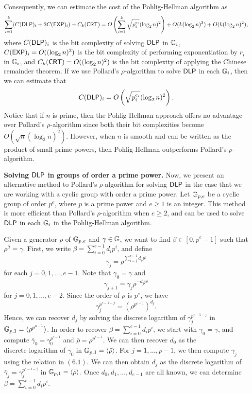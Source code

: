 \newpage 
Consequently, we can estimate the cost of the Pohlig-Hellman algorithm as 
\[ \sum_{i=1}^k (C({\sf DLP})_i + 2C({\sf EXP})_i) + C_k({\sf CRT}) = 
O \left( \sum_{i=1}^k \sqrt{p_i^{e_i}} (\log_2 n)^2 \right) + 
O(k(\log_2 n)^3) + O(k(\log_2 n)^2), \] 
where $C({\sf DLP})_i$ is the bit complexity of solving ${\sf DLP}$ in $\mathbb{G}_i$, 
$C({\sf EXP})_i = O((\log_2 n)^3)$ is the bit complexity of performing exponentiation 
by $r_i$ in $\mathbb{G}_i$, and $C_k({\sf CRT}) = O((\log_2 n)^2)$ is the bit complexity of 
applying the Chinese remainder theorem. If we use Pollard's $\rho$-algorithm 
to solve ${\sf DLP}$ in each $\mathbb{G}_i$, then we can estimate that 
\[ C({\sf DLP})_i = O\left( \sqrt{p_i^{e_i}} (\log_2 n)^2 \right). \] 
Notice that if $n$ is prime, then the Pohlig-Hellman approach offers no advantage 
over Pollard's $\rho$-algorithm since both their bit complexities become 
$O(\sqrt n (\log_2 n)^2)$. However, when $n$ is smooth and can be written as 
the product of small prime powers, then Pohlig-Hellman outperforms Pollard's 
$\rho$-algorithm.

{\bf Solving ${\sf DLP}$ in groups of order a prime power.} Now, we present 
an alternative method to Pollard's $\rho$-algorithm for solving ${\sf DLP}$ in the 
case that we are working with a cyclic group with order a prime power. 
Let $\mathbb{G}_{p,e}$ be a cyclic group of order $p^e$, where $p$ is a prime power and 
$e \geq 1$ is an integer. This method is more efficient than Pollard's 
$\rho$-algorithm when $e \geq 2$, and can be used to solve ${\sf DLP}$ in each $\mathbb{G}_i$ 
in the Pohlig-Hellman algorithm. 

Given a generator $\rho$ of $\mathbb{G}_{p,e}$ and $\gamma \in \mathbb{G}$, we want to find 
$\beta \in [0, p^e - 1]$ such that $\rho^\beta = \gamma$. First, we write 
$\beta = \sum_{i=0}^{e-1} d_i p^i$, and define 
\[ \gamma_j = \rho^{\sum_{i=j}^{e-1} d_j p^j} \] 
for each $j = 0, 1, \dots, e-1$. Note that $\gamma_0 = \gamma$ and 
\begin{equation} \gamma_{j+1} = \gamma_j \rho^{-d_j p^j} \end{equation}
for $j = 0, 1, \dots, e-2$. Since the order of $\rho$ is $p^e$, we have 
\[ \gamma_j^{p^{e-1-j}} = \left( \rho^{p^{e-1}} \right)^{d_j}. \] 
Hence, we can recover $d_j$ by solving the discrete logarithm of 
$\gamma_j^{p^{e-1-j}}$ in $\mathbb{G}_{p,1} = \langle \rho^{p^{e-1}} \rangle$. In order 
to recover $\beta = \sum_{i=0}^{e-1} d_i p^i$, we start with $\gamma_0 = \gamma$,
and compute $\bar\gamma_0 = \gamma_0^{p^{e-1}}$ and $\bar\rho = 
\rho^{p^{e-1}}$. We can then recover $d_0$ as the \\[4pt] discrete logarithm of 
$\bar\gamma_0$ in $\mathbb{G}_{p,1} = \langle \bar\rho \rangle$. For $j = 1, \dots, p-1$, 
we then compute $\gamma_j$ using the relation in $(6.1)$. We can then obtain 
$d_j$ as the discrete logarithm of $\bar\gamma_j = \gamma_j^{p^{e-1-j}}$ in 
$\mathbb{G}_{p,1} = \langle \bar\rho \rangle$. Once $d_0, d_1, \dots, d_{e-1}$ are 
all known, we can determine $\beta = \sum_{i=0}^{e-1} d_i p^i$. 

